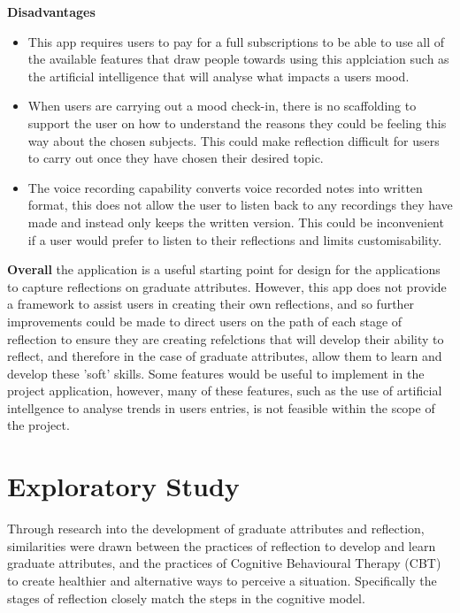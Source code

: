 \documentclass{l4proj}
\begin{document}
\textbf{Disadvantages}
\begin{itemize}
    \item This app requires users to pay for a full subscriptions to be able to use all of the available features that draw people towards using this applciation
    such as the artificial intelligence that will analyse what impacts a users mood. 
    \item When users are carrying out a mood check-in, there is no scaffolding to support the user on how to understand the reasons they could be feeling 
    this way about the chosen subjects. This could make reflection difficult for users to carry out once they have chosen their desired topic.
    \item The voice recording capability converts voice recorded notes into written format, this does not allow the user to listen back to any recordings they 
    have made and instead only keeps the written version. This could be inconvenient if a user would prefer to listen to their reflections and limits customisability.
\end{itemize}

\textbf{Overall} the application is a useful starting point for design for the applications to capture reflections on graduate attributes. However, this app
does not provide a framework to assist users in creating their own reflections, and so further improvements could be made to direct users on the path
of each stage of reflection to ensure they are creating refelctions that will develop their ability to reflect, and therefore in the case of graduate attributes,
allow them to learn and develop these 'soft' skills. Some features would
be useful to implement in the project application, however, many of these features, such as the use of artificial intellgence to analyse trends in users
entries, is not feasible within the scope of the project.

\chapter{Exploratory Study} \label{ExploratoryStudy}

Through research into the development of graduate attributes and reflection, similarities were drawn between the practices of reflection to develop and learn graduate attributes, and the practices of Cognitive Behavioural Therapy (CBT) to create healthier and alternative ways to perceive a situation. Specifically the stages of reflection closely match the steps in the cognitive model. 
\end{document}
